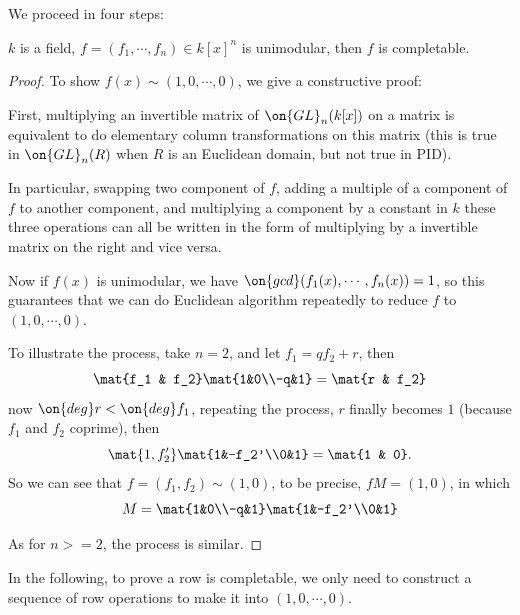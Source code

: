 We proceed in four steps:
\begin{lem}\label{PID}
	$k$ is a field, $f=(f_1,\cdots,f_n)\in k[x]^n$ is unimodular, then $f$ is completable.
\end{lem}
\begin{proof}
	 To show $f(x)\sim (1,0,\cdots,0)$, we give a constructive proof:
	 
	 First, multiplying an invertible matrix of $\on{GL}_n(k[x])$ on a matrix is equivalent to do elementary column transformations on this matrix (this is true in $\on{GL}_n(R)$ when $R$ is an Euclidean domain, but not true in PID).
	 
	 In particular, swapping two component of $f$, adding a multiple of a component of $f$ to another component, and multiplying a component by a constant in $k$ these three operations can all be written in the form of multiplying by a invertible matrix on the right and vice versa.
	 
	Now if $f(x)$ is unimodular, we have $\on{gcd}(f_1(x),\cdots,f_n(x))=1$, so this guarantees that we can do Euclidean algorithm repeatedly to reduce $f$ to $(1,0,\cdots,0)$.
	
	To illustrate the process, take $n=2$, and let $f_1 = qf_2+r$, then
	$$
	\mat{f_1 & f_2}\mat{1&0\\-q&1} = \mat{r & f_2}
	$$
	now $\on{deg}r<\on{deg}f_1$, repeating the process, $r$ finally becomes $1$ (because $f_1$ and $f_2$ coprime), then
	$$
	\mat{1,f_2'}\mat{1&-f_2'\\0&1} = \mat{1 & 0}.
	$$
	So we can see that $f=(f_1,f_2)\sim (1,0)$, to be precise, $fM=(1,0)$, in which
	$$
	M=\mat{1&0\\-q&1}\mat{1&-f_2'\\0&1}
	$$
	
	As for $n>=2$, the process is similar.
\end{proof}
\begin{rmk}
	In the following, to prove a row is completable, we only need to construct a sequence of row operations to make it into $(1,0,\cdots,0)$.
\end{rmk}

